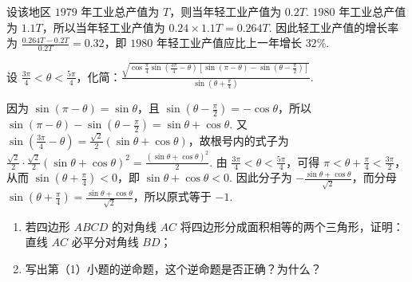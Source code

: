 \begin{solution}
设该地区 \(1979\) 年工业总产值为 \(T\)，则当年轻工业产值为 \(0.2T\). \(1980\) 年工业总产值为 \(1.1T\)，所以当年轻工业产值为 \(0.24\times1.1T=0.264T\). 因此轻工业产值的增长率为 \(\frac{0.264T-0.2T}{0.2T}=0.32\)，即 \(1980\) 年轻工业产值应比上一年增长 \(32\%\).
\end{solution}

\begin{problem}
设 \(\frac{3\pi}{4}<\theta<\frac{5\pi}{4}\)，化简：\(\frac{\sqrt{\cos\frac{\pi}{4}\sin\left(\frac{3\pi}{4}-\theta\right)\left[\sin(\pi-\theta)-\sin\left(\theta-\frac{\pi}{2}\right)\right]}}{\sin\left(\theta+\frac{\pi}{4}\right)}\).
\end{problem}

\begin{solution}
因为 \(\sin(\pi-\theta)=\sin\theta\)，且 \(\sin\left(\theta-\frac{\pi}{2}\right)=-\cos\theta\)，所以
\(\sin(\pi-\theta)-\sin\left(\theta-\frac{\pi}{2}\right)=\sin\theta+\cos\theta\). 又 \(\sin\left(\frac{3\pi}{4}-\theta\right)=\frac{\sqrt{2}}{2}(\sin\theta+\cos\theta)\)，故根号内的式子为 \(\frac{\sqrt{2}}{2}\cdot\frac{\sqrt{2}}{2}(\sin\theta+\cos\theta)^2=\frac{(\sin\theta+\cos\theta)^2}{2}\). 由 \(\frac{3\pi}{4}<\theta<\frac{5\pi}{4}\)，可得 \(\pi<\theta+\frac{\pi}{4}<\frac{3\pi}{2}\)，从而 \(\sin\left(\theta+\frac{\pi}{4}\right)<0\)，即 \(\sin\theta+\cos\theta<0\). 因此分子为 \(-\frac{\sin\theta+\cos\theta}{\sqrt{2}}\)，而分母 \(\sin\left(\theta+\frac{\pi}{4}\right)=\frac{\sin\theta+\cos\theta}{\sqrt{2}}\)，所以原式等于 \(-1\).
\end{solution}

\begin{problem}
\begin{enumerate}
\item 若四边形 \(ABCD\) 的对角线 \(AC\) 将四边形分成面积相等的两个三角形，证明：直线 \(AC\) 必平分对角线 \(BD\)；
\item 写出第（1）小题的逆命题，这个逆命题是否正确？为什么？
\end{enumerate}
\end{problem}

